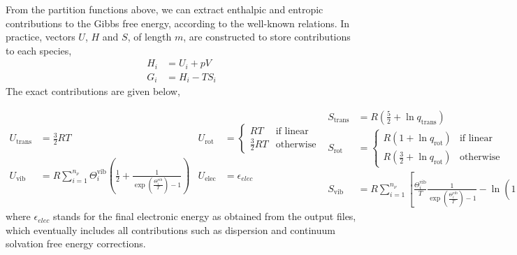 From the partition functions above,
we can extract enthalpic and entropic contributions to the Gibbs free energy,
according to the well-known relations.
In practice,
vectors $U$,
$H$ and $S$,
of length $m$,
are constructed to store contributions to each species,
% 
\begin{equation}
	\begin{split}
		H_i &= U_i + p V \\
		G_i & = H_i - T S_i
	\end{split}
\end{equation}
% 
The exact contributions are given below,

\begin{subequations}
	\begin{align}
		U_\text{trans}
		 & = \frac{3}{2} R T
		 & U_\text{rot}
		 & = \begin{cases}
			     R T             & \text{if linear} \\
			     \frac{3}{2} R T & \text{otherwise}
		     \end{cases} \\
		U_\text{vib}
		 & = R \sum_{i = 1}^{n_\nu}
		\Theta^\text{vib}_i
		\left(
		\frac{1}{2}
		+ \frac{1}{
			\exp \left( \frac{\Theta^\text{vib}_i}{T}\right)
			- 1
		}
		\right)
		 & U_\text{elec}
		 & = \epsilon_{elec}
	\end{align}
	\begin{align}
		S_\text{trans}
		 & = R \left(
		\frac{5}{2}
		+ \ln{q_\text{trans}}
		\right)
		 & S_\text{elec}
		 & = R \ln{q_\text{elec}}                           \\
		S_\text{rot}
		 & = \begin{cases}
			     R \left(
			     1
			     + \ln{q_\text{rot}}
			     \right) & \text{if linear} \\
			     R \left(
			     \frac{3}{2}
			     + \ln{q_\text{rot}}
			     \right) & \text{otherwise}
		     \end{cases} \\
		S_\text{vib}
		 & = R \sum_{i = 1}^{n_\nu}
		\left[
			\frac{
				\Theta^\text{vib}_i
			}{T}
			\frac{1}{
				\exp \left( \frac{\Theta^\text{vib}_i}{T}\right)
				- 1
			}
			- \ln{\left(
				1
				- \exp \left( - \frac{\Theta^\text{vib}_i}{T}\right)
				\right)}
			\right]
	\end{align}
\end{subequations}
% 
where $\epsilon_{elec}$ stands for the final electronic energy as obtained from the output files,
which eventually includes all contributions such as dispersion and continuum solvation free energy corrections.

